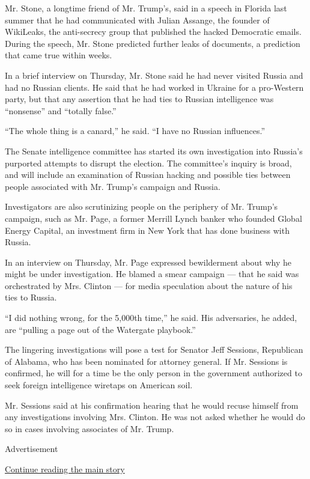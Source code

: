 Mr. Stone, a longtime friend of Mr. Trump's, said in a speech in Florida
last summer that he had communicated with Julian Assange, the founder of
WikiLeaks, the anti-secrecy group that published the hacked Democratic
emails. During the speech, Mr. Stone predicted further leaks of
documents, a prediction that came true within weeks.

In a brief interview on Thursday, Mr. Stone said he had never visited
Russia and had no Russian clients. He said that he had worked in Ukraine
for a pro-Western party, but that any assertion that he had ties to
Russian intelligence was ``nonsense'' and ``totally false.''

``The whole thing is a canard,'' he said. ``I have no Russian
influences.''

The Senate intelligence committee has started its own investigation into
Russia's purported attempts to disrupt the election. The committee's
inquiry is broad, and will include an examination of Russian hacking and
possible ties between people associated with Mr. Trump's campaign and
Russia.

Investigators are also scrutinizing people on the periphery of Mr.
Trump's campaign, such as Mr. Page, a former Merrill Lynch banker who
founded Global Energy Capital, an investment firm in New York that has
done business with Russia.

In an interview on Thursday, Mr. Page expressed bewilderment about why
he might be under investigation. He blamed a smear campaign --- that he
said was orchestrated by Mrs. Clinton --- for media speculation about
the nature of his ties to Russia.

``I did nothing wrong, for the 5,000th time,'' he said. His adversaries,
he added, are ``pulling a page out of the Watergate playbook.''

The lingering investigations will pose a test for Senator Jeff Sessions,
Republican of Alabama, who has been nominated for attorney general. If
Mr. Sessions is confirmed, he will for a time be the only person in the
government authorized to seek foreign intelligence wiretaps on American
soil.

Mr. Sessions said at his confirmation hearing that he would recuse
himself from any investigations involving Mrs. Clinton. He was not asked
whether he would do so in cases involving associates of Mr. Trump.

Advertisement

\protect\hyperlink{after-bottom}{Continue reading the main story}

